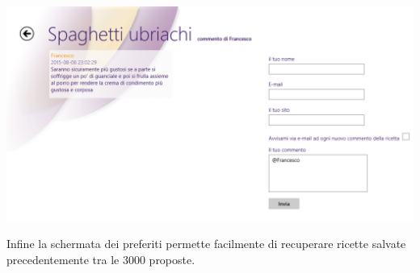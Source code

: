 \begin{center}
\includegraphics[scale=0.5] {img/Giallozafferano/commento_risposta.png}  
\end{center}

Infine la schermata dei preferiti permette facilmente di recuperare ricette salvate precedentemente tra le 3000 proposte.

